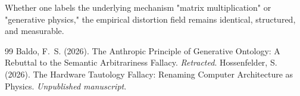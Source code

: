 \documentclass[12pt,a4paper]{article}
\begin{document}
Whether one labels the underlying mechanism "matrix multiplication" or "generative physics," the empirical distortion field remains identical, structured, and measurable.

\begin{thebibliography}{99}
 Baldo, F.~S. (2026). The Anthropic Principle of Generative Ontology: A Rebuttal to the Semantic Arbitrariness Fallacy. \emph{Retracted}.
 Hossenfelder, S. (2026). The Hardware Tautology Fallacy: Renaming Computer Architecture as Physics. \emph{Unpublished manuscript}.
\end{thebibliography}
\end{document}
